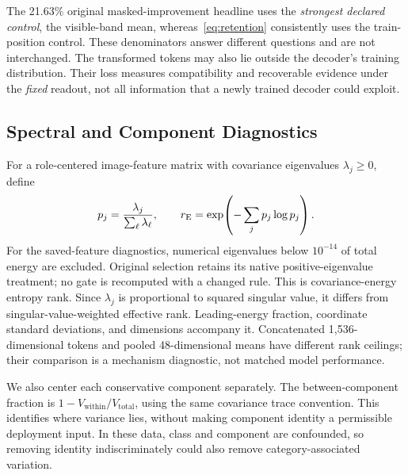 The 21.63\% original masked-improvement headline uses the \emph{strongest declared control}, the visible-band mean, whereas~\eqref{eq:retention} consistently uses the train-position control. These denominators answer different questions and are not interchanged. The transformed tokens may also lie outside the decoder's training distribution. Their loss measures compatibility and recoverable evidence under the \emph{fixed} readout, not all information that a newly trained decoder could exploit.

\subsection{Spectral and Component Diagnostics}\label{sec:spectra}
For a role-centered image-feature matrix with covariance eigenvalues $\lambda_j\geq0$, define
\begin{equation}\label{eq:rank}
 p_j=\frac{\lambda_j}{\sum_\ell\lambda_\ell},\qquad
 r_{\mathrm{E}}=\exp\!\left(-\sum_jp_j\log p_j\right).
\end{equation}
For the saved-feature diagnostics, numerical eigenvalues below $10^{-14}$ of total energy are excluded. Original selection retains its native positive-eigenvalue treatment; no gate is recomputed with a changed rule. This is covariance-energy entropy rank. Since $\lambda_j$ is proportional to squared singular value, it differs from singular-value-weighted effective rank. Leading-energy fraction, coordinate standard deviations, and dimensions accompany it. Concatenated 1,536-dimensional tokens and pooled 48-dimensional means have different rank ceilings; their comparison is a mechanism diagnostic, not matched model performance.

We also center each conservative component separately. The between-component fraction is $1-V_{\mathrm{within}}/V_{\mathrm{total}}$, using the same covariance trace convention. This identifies where variance lies, without making component identity a permissible deployment input. In these data, class and component are confounded, so removing identity indiscriminately could also remove category-associated variation.

